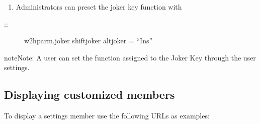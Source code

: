\documentclass[letterpaper,10pt,english]{sphinxmanual}
\begin{document}
\begin{sphinxVerbatim}[commandchars=\\\{\}]
\end{sphinxVerbatim}
\begin{enumerate}
\def\theenumi{\arabic{enumi}}
\def\labelenumi{\theenumi .}
\makeatletter\def\p@enumii{\p@enumi \theenumi .}\makeatother
\setcounter{enumi}{2}
\item {} 
Administrators can preset the joker key function with

\end{enumerate}
\begin{description}
\item[{::}] \leavevmode
w2hparm.joker \textbar{} shiftjoker \textbar{} altjoker = “Ins”

\end{description}

\begin{sphinxadmonition}{note}{Note:}
A user can set the function assigned to the Joker Key through the user settings.
\end{sphinxadmonition}


\ignorespaces 

\subsection{Displaying customized members}
\label{\detokenize{Customization:displaying-customized-members}}\label{\detokenize{Customization:index-2}}
To display a settings member use the following URLs as examples:

\begin{sphinxVerbatim}[commandchars=\\\{\}]
\end{sphinxVerbatim}

\end{document}

